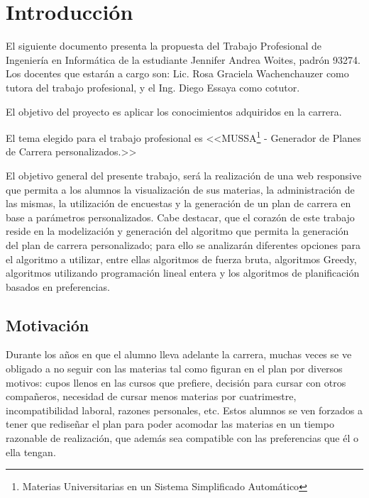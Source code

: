 \documentclass[a4paper]{article}
\begin{document}
  \newpage
  

  \tableofcontents %
    
  \pagestyle{fancy}
  \rhead{}
  \renewcommand{\headrulewidth}{0.4pt} %

  \newpage


\section{Introducción}

El siguiente documento presenta la propuesta del Trabajo Profesional de Ingeniería en Informática de la estudiante Jennifer Andrea Woites, padrón 93274. Los docentes que estarán a cargo son: Lic. Rosa Graciela Wachenchauzer como tutora del trabajo profesional, y el Ing. Diego Essaya como cotutor. \newline

El objetivo del proyecto es aplicar los conocimientos adquiridos en la carrera. \newline

El tema elegido para el trabajo profesional es <<MUSSA\footnote{Materias Universitarias en un Sistema Simplificado Automático} - Generador de Planes de Carrera personalizados.>> \newline

El objetivo general del presente trabajo, será la realización de una web responsive que permita a los alumnos la visualización de sus materias, la administración de las mismas, la utilización de encuestas y la generación de un plan de carrera en base a parámetros personalizados. Cabe destacar, que el corazón de este trabajo reside en la modelización y generación del algoritmo que permita la generación del plan de carrera personalizado; para ello se analizarán diferentes opciones para el algoritmo a utilizar, entre ellas algoritmos de fuerza bruta, algoritmos Greedy, algoritmos utilizando programación lineal entera y los algoritmos de planificación basados en preferencias.

\subsection{Motivación}

Durante los años en que el alumno lleva adelante la carrera, muchas veces se ve obligado a no seguir con las materias tal como figuran en el plan por diversos motivos: cupos llenos en las cursos que prefiere, decisión para cursar con otros compañeros, necesidad de cursar menos materias por cuatrimestre, incompatibilidad laboral, razones personales, etc. Estos alumnos se ven forzados a tener que rediseñar el plan para poder acomodar las materias en un tiempo razonable de realización, que además sea compatible con las preferencias que él o ella tengan.
\end{document}

